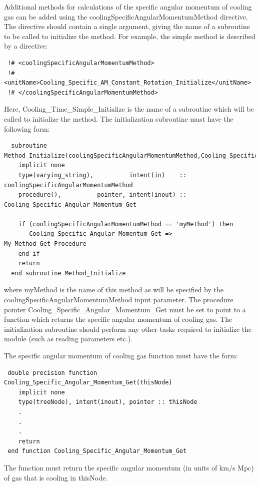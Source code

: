 Additional methods for calculations of the specific angular momentum of cooling gas can be added using the {\normalfont \ttfamily coolingSpecificAngularMomentumMethod} directive. The directive should contain a single argument, giving the name of a subroutine to be called to initialize the method. For example, the {\normalfont \ttfamily simple} method is described by a directive:
\begin{verbatim}
 !# <coolingSpecificAngularMomentumMethod>
 !#  <unitName>Cooling_Specific_AM_Constant_Rotation_Initialize</unitName>
 !# </coolingSpecificAngularMomentumMethod>
\end{verbatim}
Here, {\normalfont \ttfamily Cooling\_Time\_Simple\_Initialize} is the name of a subroutine which will be called to initialize the method. The initialization subroutine must have the following form:
\begin{verbatim}
  subroutine Method_Initialize(coolingSpecificAngularMomentumMethod,Cooling_Specific_Angular_Momentum_Get)
    implicit none
    type(varying_string),          intent(in)    :: coolingSpecificAngularMomentumMethod
    procedure(),          pointer, intent(inout) :: Cooling_Specific_Angular_Momentum_Get
    
    if (coolingSpecificAngularMomentumMethod == 'myMethod') then
       Cooling_Specific_Angular_Momentum_Get => My_Method_Get_Procedure
    end if
    return
  end subroutine Method_Initialize
\end{verbatim}
where {\normalfont \ttfamily myMethod} is the name of this method as will be specified by the {\normalfont \ttfamily coolingSpecificAngularMomentumMethod} input parameter. The procedure pointer {\normalfont \ttfamily Cooling\_Specific\_Angular\_Momentum\_Get} must be set to point to a function which returns the specific angular momentum of cooling gas. The initialization subroutine should perform any other tasks required to initialize the module (such as reading parameters etc.).

The specific angular momentum of cooling gas function must have the form:
\begin{verbatim}
 double precision function Cooling_Specific_Angular_Momentum_Get(thisNode)
    implicit none
    type(treeNode), intent(inout), pointer :: thisNode
    .
    .
    .
    return
 end function Cooling_Specific_Angular_Momentum_Get
\end{verbatim}
The function must return the specific angular momentum (in units of km/s Mpc) of gas that is cooling in {\normalfont \ttfamily thisNode}.

